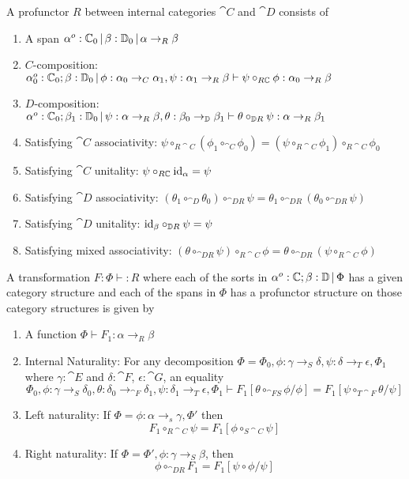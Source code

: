 \documentclass{article}
\begin{document}
\begin{definition}
  A profunctor $R$ between internal categories $\cat C$ and $\cat D$
  consists of
  \begin{enumerate}
  \item A span $\alpha^o : \mathbb C_0\,|\, \beta : \mathbb D_0 \,|\, \alpha \to_{R} \beta$
  \item $C$-composition: $\alpha_0^o:\mathbb C_0;\beta : \mathbb D_0\,|\, \phi : \alpha_0 \to_{C} \alpha_1, \psi : \alpha_1 \to_{R} \beta \vdash \psi \circ_{R\mathbb C} \phi : \alpha_0 \to_{R} \beta$
  \item $D$-composition: $\alpha^o:\mathbb C_0;\beta_1 : \mathbb D_0\,|\, \psi : \alpha \to_{R} \beta, \theta : \beta_0 \to_{\mathbb D} \beta_1 \vdash \theta \circ_{\mathbb DR} \psi : \alpha \to_{R} \beta_1$
  \item Satisfying $\cat C$ associativity: $\psi \circ_{R\cat C} (\phi_1 \circ_{\cat C} \phi_0) = (\psi \circ_{R\cat C} \phi_1) \circ_{R\cat C} \phi_0$
  \item Satisfying $\cat C$ unitality: $\psi \circ_{R\mathbb C} \text{id}_{\alpha} = \psi$
  \item Satisfying $\cat D$ associativity: $(\theta_1 \circ_{\cat D} \theta_0) \circ_{\cat DR} \psi = \theta_1 \circ_{\cat D R} (\theta_0 \circ_{\cat DR} \psi)$
  \item Satisfying $\cat D$ unitality: $\text{id}_{\beta} \circ_{\mathbb D R} \psi = \psi$
  \item Satisfying mixed associativity: $(\theta \circ_{\cat D R} \psi) \circ_{R \cat C} \phi = \theta \circ_{\cat D R} (\psi \circ_{R \cat C} \phi)$
  \end{enumerate}
\end{definition}

\begin{definition}
  A transformation $F : \Phi \vdash : R$ where each of the sorts in
  $\alpha^o: \mathbb C;\beta : \mathbb D \,|\, \Phi$ has a given category
  structure and each of the spans in $\Phi$ has a profunctor structure
  on those category structures is given by
  \begin{enumerate}
  \item A function $\Phi \vdash F_1 : \alpha \to_{R} \beta$
  \item Internal Naturality: For any decomposition $\Phi = \Phi_0,\phi
    : \gamma \to_{S} \delta,\psi : \delta \to_{T} \epsilon,\Phi_1$
    where $\gamma : \cat E$ and $\delta : \cat F$, $\epsilon : \cat
    G$, an equality
    \[ \Phi_0,\phi : \gamma\to_{S} \delta_0, \theta : \delta_0 \to_{\cat F} \delta_1,\psi : \delta_1\to_T \epsilon, \Phi_1 \vdash F_1[\theta \circ_{\cat F S} \phi/\phi] = F_1[\psi \circ_{T \cat F}\theta /\psi] \]
  \item Left naturality: If $\Phi = \phi : \alpha \to_{s} \gamma,\Phi'$
    then \[ F_1 \circ_{R\cat C} \psi = F_1[\phi \circ_{S\cat C} \psi]\]
  \item Right naturality: If $\Phi = \Phi', \phi : \gamma \to_{S}
    \beta$, then
    \[ \phi \circ_{\cat D R} F_1 = F_1[\psi \circ \phi/\psi]\]
  \end{enumerate}
\end{definition}
\end{document}
